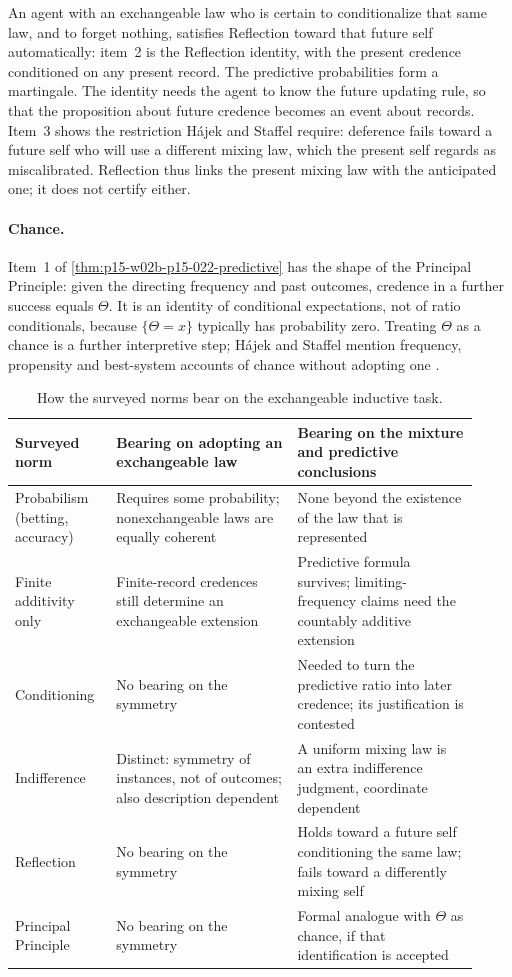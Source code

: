 An agent with an exchangeable law who is certain to conditionalize that same
law, and to forget nothing, satisfies Reflection toward that future self
automatically: item~2 is the Reflection identity, with the present credence
conditioned on any present record. The predictive probabilities form a
martingale. The identity needs the agent to know the future updating rule,
so that the proposition about future credence becomes an event about
records. Item~3 shows the restriction H\'ajek and Staffel require: deference
fails toward a future self who will use a different mixing law, which the
present self regards as miscalibrated. Reflection thus links the present
mixing law with the anticipated one; it does not certify either.

\paragraph{Chance.}
Item~1 of \cref{thm:p15-w02b-p15-022-predictive} has the shape of the
Principal Principle: given the directing frequency and past outcomes,
credence in a further success equals \(\Theta\). It is an identity of
conditional expectations, not of ratio conditionals, because
\(\{\Theta=x\}\) typically has probability zero. Treating \(\Theta\) as a
chance is a further interpretive step; H\'ajek and Staffel mention frequency,
propensity and best-system accounts of chance without adopting one
\cite[pp.~240 and~243]{HajekStaffel2021Dynamics}.

\begin{table}[htbp]
\centering\small
\begin{tabular}{p{0.2\linewidth}p{0.36\linewidth}p{0.36\linewidth}}
\hline
Surveyed norm & Bearing on adopting an exchangeable law & Bearing on the mixture and predictive conclusions\\
\hline
Probabilism (betting, accuracy) & Requires some probability; nonexchangeable laws are equally coherent & None beyond the existence of the law that is represented\\
Finite additivity only & Finite-record credences still determine an exchangeable extension & Predictive formula survives; limiting-frequency claims need the countably additive extension\\
Conditioning & No bearing on the symmetry & Needed to turn the predictive ratio into later credence; its justification is contested\\
Indifference & Distinct: symmetry of instances, not of outcomes; also description dependent & A uniform mixing law is an extra indifference judgment, coordinate dependent\\
Reflection & No bearing on the symmetry & Holds toward a future self conditioning the same law; fails toward a differently mixing self\\
Principal Principle & No bearing on the symmetry & Formal analogue with \(\Theta\) as chance, if that identification is accepted\\
\hline
\end{tabular}
\caption{How the surveyed norms bear on the exchangeable inductive task.}
\label{tab:p15-w02b-p15-022-comparison}
\end{table}

